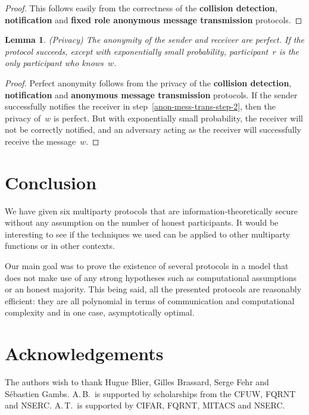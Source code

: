 \documentclass[11pt]{article}
\newtheorem{lemma}[theorem]{Lemma}
\begin{document}
\begin{proof}
This follows easily from the correctness of the \textbf{collision
detection}, \textbf{notification} and \textbf{fixed role anonymous
message transmission} protocols.
\end{proof}

\begin{lemma}(Privacy)
The anonymity of the sender and receiver are perfect. If the
protocol succeeds, except with exponentially small probability,
participant~$r$ is the only participant who knows~$w$.
\end{lemma}
\begin{proof}
Perfect anonymity follows from the privacy of the \textbf{collision
detection}, \textbf{notification} and \textbf{anonymous message
transmission} protocols. If the sender successfully notifies the
receiver in step~\ref{anon-mess-trans-step-2}, then the privacy
of~$w$ is perfect. But with exponentially small probability, the
receiver will not be correctly notified, and an adversary acting as
the receiver will successfully receive the message~$w$.
\end{proof}

\section{Conclusion}

We have given six multiparty protocols that are
information-theoretically secure without any assumption on the
number of honest participants. It would be interesting to see if the
techniques we used can be applied to other multiparty functions or
in other contexts.

Our main goal was to prove the existence of several protocols in a
model that does not make use of any strong hypotheses such as
computational assumptions or an honest majority. This being said,
all the presented protocols are reasonably efficient: they are all
polynomial in terms of communication and computational complexity
and in one case, asymptotically optimal.

\section*{Acknowledgements}
The authors wish to thank Hugue Blier, Gilles Brassard, Serge Fehr
and S\'ebastien Gambs. A.\,B.\ is supported by scholarships from the
\textsc{CFUW}, \textsc{FQRNT} and  \textsc{NSERC}. A.\,T.\ is
supported by \textsc{CIFAR}, \textsc{FQRNT}, \textsc{MITACS} and
\textsc{NSERC}.
\end{document}
